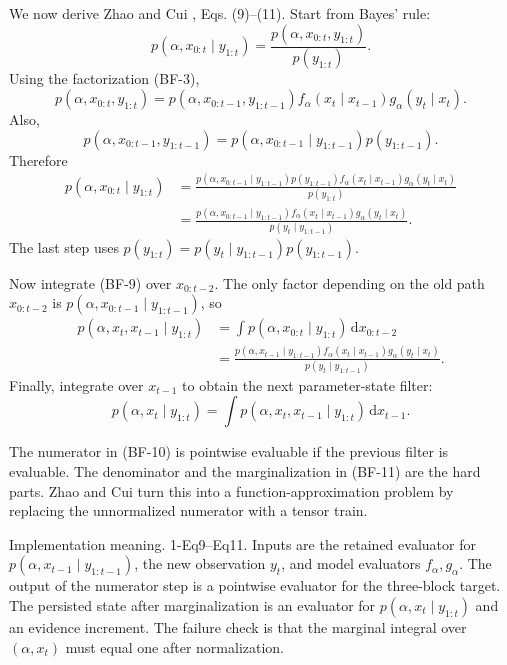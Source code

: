 \documentclass[11pt]{article}
\newcommand{\dd}{\,\mathrm d}
\begin{document}
We now derive Zhao and Cui \cite{zhao2024ttsequential}, Eqs. (9)--(11).  Start from Bayes' rule:
\[
 p(\alpha,x_{0:t}\mid y_{1:t})
 =
 \frac{p(\alpha,x_{0:t},y_{1:t})}{p(y_{1:t})}.
\]
Using the factorization (BF-3),
\[
 p(\alpha,x_{0:t},y_{1:t})
 =
 p(\alpha,x_{0:t-1},y_{1:t-1})
 f_\alpha(x_t\mid x_{t-1})g_\alpha(y_t\mid x_t).
\]
Also,
\[
 p(\alpha,x_{0:t-1},y_{1:t-1})
 =
 p(\alpha,x_{0:t-1}\mid y_{1:t-1})p(y_{1:t-1}).
\]
Therefore
\[
\begin{aligned}
 p(\alpha,x_{0:t}\mid y_{1:t})
 &=
 \frac{
 p(\alpha,x_{0:t-1}\mid y_{1:t-1})p(y_{1:t-1})
 f_\alpha(x_t\mid x_{t-1})g_\alpha(y_t\mid x_t)}
 {p(y_{1:t})}\\
 &=
 \frac{
 p(\alpha,x_{0:t-1}\mid y_{1:t-1})
 f_\alpha(x_t\mid x_{t-1})g_\alpha(y_t\mid x_t)}
 {p(y_t\mid y_{1:t-1})}.
\end{aligned}
\label{eq:p24-bf-9}
\]
The last step uses \(p(y_{1:t})=p(y_t\mid y_{1:t-1})p(y_{1:t-1})\).

Now integrate (BF-9) over \(x_{0:t-2}\).  The only factor depending on the old
path \(x_{0:t-2}\) is
\(p(\alpha,x_{0:t-1}\mid y_{1:t-1})\), so
\[
\begin{aligned}
 p(\alpha,x_t,x_{t-1}\mid y_{1:t})
 &=
 \int p(\alpha,x_{0:t}\mid y_{1:t})\dd x_{0:t-2}\\
 &=
 \frac{
 p(\alpha,x_{t-1}\mid y_{1:t-1})
 f_\alpha(x_t\mid x_{t-1})g_\alpha(y_t\mid x_t)}
 {p(y_t\mid y_{1:t-1})}.
\end{aligned}
\label{eq:p24-bf-10}
\]
Finally, integrate over \(x_{t-1}\) to obtain the next parameter-state filter:
\[
    p(\alpha,x_t\mid y_{1:t})
    =
    \int p(\alpha,x_t,x_{t-1}\mid y_{1:t})\dd x_{t-1}.
    \label{eq:p24-bf-11}
\]

The numerator in (BF-10) is pointwise evaluable if the previous filter is
evaluable.  The denominator and the marginalization in (BF-11) are the hard
parts.  Zhao and Cui \cite{zhao2024ttsequential} turn this into a function-approximation problem by replacing
the unnormalized numerator with a tensor train.

Implementation meaning. 1-Eq9--Eq11.  Inputs are the retained evaluator
for \(p(\alpha,x_{t-1}\mid y_{1:t-1})\), the new observation \(y_t\), and model
evaluators \(f_\alpha,g_\alpha\).  The output of the numerator step is a
pointwise evaluator for the three-block target.  The persisted state after
marginalization is an evaluator for \(p(\alpha,x_t\mid y_{1:t})\) and an
evidence increment.  The failure check is that the marginal integral over
\((\alpha,x_t)\) must equal one after normalization.
\end{document}

